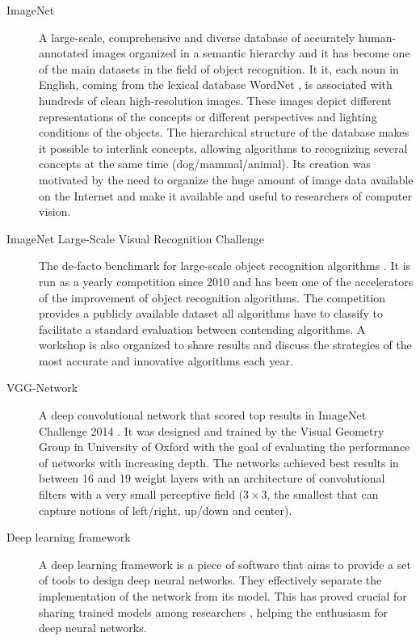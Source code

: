 \begin{description}
  \item[ImageNet]
  A large-scale, comprehensive and diverse database of accurately human-annotated images organized in a semantic hierarchy \cite{Deng2009} and it has become one of the main datasets in the field of object recognition.
  It it, each noun in English, coming from the lexical database WordNet \cite{Wilkniss1998}, is associated with hundreds of clean high-resolution images.
  These images depict different representations of the concepts or different perspectives and lighting conditions of the objects.
  The hierarchical structure of the database makes it possible to interlink concepts, allowing algorithms to recognizing several concepts at the same time (dog/mammal/animal).
  Its creation was motivated by the need to organize the huge amount of image data available on the Internet and make it available and useful to researchers of computer vision.

  \item[ImageNet Large-Scale Visual Recognition Challenge]
  The de-facto benchmark for large-scale object recognition algorithms \cite{Russakovsky2015}.
  It is run as a yearly competition since 2010 and has been one of the accelerators of the improvement of object recognition algorithms.
  The competition provides a publicly available dataset all algorithms have to classify to facilitate a standard evaluation between contending algorithms.
  A workshop is also organized to share results and discuss the strategies of the most accurate and innovative algorithms each year.

  \item[VGG-Network]
  A deep convolutional network that scored top results in ImageNet Challenge 2014 \cite{Simonyan2014}.
  It was designed and trained by the Visual Geometry Group in University of Oxford with the goal of evaluating the performance of networks with increasing depth.
  The networks achieved best results in between 16 and 19 weight layers with an architecture of convolutional filters with a very small perceptive field ($3\times3$, the smallest that can capture notions of left/right, up/down and center).

  \item[Deep learning framework]
  A deep learning framework is a piece of software that aims to provide a set of tools to design deep neural networks.
  They effectively separate the implementation of the network from its model.
  This has proved crucial for sharing trained models among researchers \cite{Jia2014}, helping the enthusiasm for deep neural networks.
\end{description}


